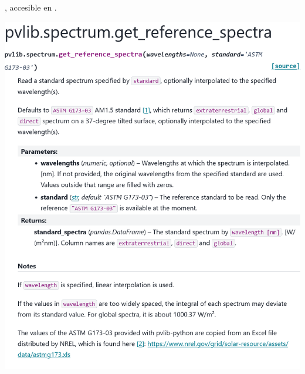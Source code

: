 \begin{myparindent}{0pt}
, accesible en .

\includegraphics[width=\linewidth,height=0.9\textheight,keepaspectratio]{images/docs_funcs_cut/get_reference_spectra_0.png}


\end{myparindent}
